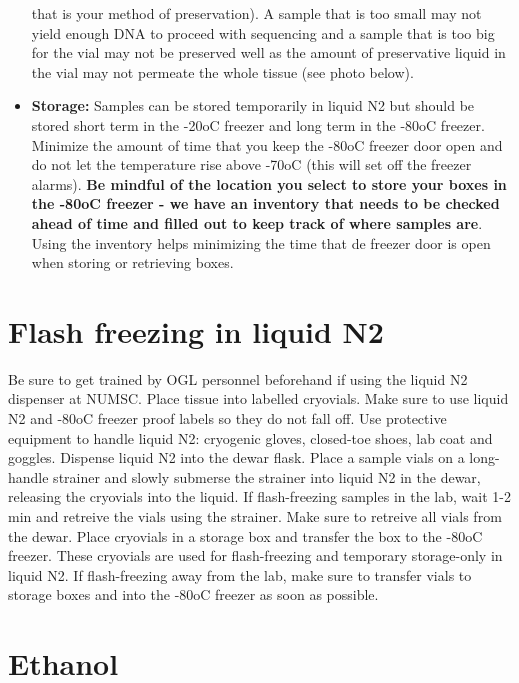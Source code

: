 \documentclass[
  letterpaper,
  DIV=11,
  numbers=noendperiod]{scrreprt}
\begin{document}
\begin{itemize}
  that is your method of preservation). A sample that is too small may
  not yield enough DNA to proceed with sequencing and a sample that is
  too big for the vial may not be preserved well as the amount of
  preservative liquid in the vial may not permeate the whole tissue (see
  photo below).
\item
  \textbf{Storage:} Samples can be stored temporarily in liquid N2 but
  should be stored short term in the -20oC freezer and long term in the
  -80oC freezer. Minimize the amount of time that you keep the -80oC
  freezer door open and do not let the temperature rise above -70oC
  (this will set off the freezer alarms). \textbf{Be mindful of the
  location you select to store your boxes in the -80oC freezer - we have
  an inventory that needs to be checked ahead of time and filled out to
  keep track of where samples are}. Using the inventory helps minimizing
  the time that de freezer door is open when storing or retrieving
  boxes.
\end{itemize}

\hypertarget{flash-freezing-in-liquid-n2}{%
\section*{\texorpdfstring{\textbf{Flash freezing in liquid
N2}}{Flash freezing in liquid N2}}\label{flash-freezing-in-liquid-n2}}

Be sure to get trained by OGL personnel beforehand if using the liquid
N2 dispenser at NUMSC. Place tissue into labelled cryovials. Make sure
to use liquid N2 and -80oC freezer proof labels so they do not fall off.
Use protective equipment to handle liquid N2: cryogenic gloves,
closed-toe shoes, lab coat and goggles. Dispense liquid N2 into the
dewar flask. Place a sample vials on a long-handle strainer and slowly
submerse the strainer into liquid N2 in the dewar, releasing the
cryovials into the liquid. If flash-freezing samples in the lab, wait
1-2 min and retreive the vials using the strainer. Make sure to retreive
all vials from the dewar. Place cryovials in a storage box and transfer
the box to the -80oC freezer. These cryovials are used for
flash-freezing and temporary storage-only in liquid N2. If
flash-freezing away from the lab, make sure to transfer vials to storage
boxes and into the -80oC freezer as soon as possible.

\hypertarget{ethanol}{%
\section*{\texorpdfstring{\textbf{Ethanol}}{Ethanol}}\label{ethanol}}
\end{document}
